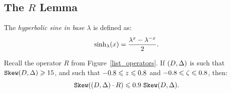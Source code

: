 \subsection[The R Lemma]{The $R$ Lemma}
\label{ssect-R}

\begin{definition}
  The \emph{hyperbolic sine in base $\lambda$} is defined as:
\[
  \sinh_{\lambda}(x) = \frac{\lambda^x-\lambda^{-x}}{2}.
\]
\end{definition}

\begin{lemma}
\label{lemmaR}
Recall the operator $R$ from Figure~\ref{list_operators}. 
If $(D,\Delta)$ is such that $\sk\state\geq\formula{\P}$, and
such that $\formula{-\r}\leq z\leq\formula{\r}$ and $\formula{-\r}\leq
\zeta\leq\formula{\r}$, then:
\[
  \sk(\state\cdot R) \leq \formula{\Qstep}~\sk\state. 
\]
\end{lemma}

